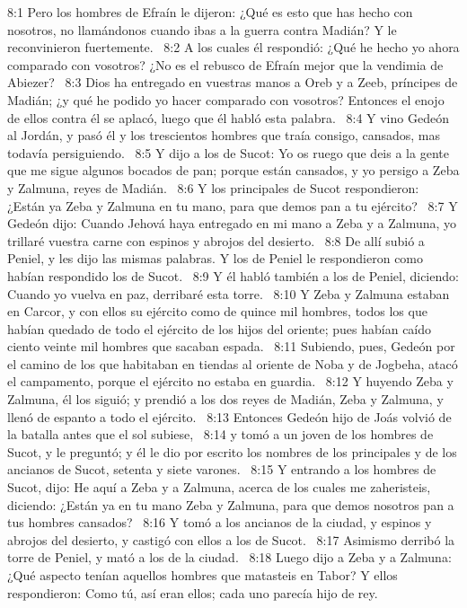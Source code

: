 8:1 Pero los hombres de Efraín le dijeron: ¿Qué es esto que has hecho con nosotros, no llamándonos cuando ibas a la guerra contra Madián? Y le reconvinieron fuertemente.  
8:2 A los cuales él respondió: ¿Qué he hecho yo ahora comparado con vosotros? ¿No es el rebusco de Efraín mejor que la vendimia de Abiezer?  
8:3 Dios ha entregado en vuestras manos a Oreb y a Zeeb, príncipes de Madián; ¿y qué he podido yo hacer comparado con vosotros? Entonces el enojo de ellos contra él se aplacó, luego que él habló esta palabra.  
8:4 Y vino Gedeón al Jordán, y pasó él y los trescientos hombres que traía consigo, cansados, mas todavía persiguiendo.  
8:5 Y dijo a los de Sucot: Yo os ruego que deis a la gente que me sigue algunos bocados de pan; porque están cansados, y yo persigo a Zeba y Zalmuna, reyes de Madián.  
8:6 Y los principales de Sucot respondieron: ¿Están ya Zeba y Zalmuna en tu mano, para que demos pan a tu ejército?  
8:7 Y Gedeón dijo: Cuando Jehová haya entregado en mi mano a Zeba y a Zalmuna, yo trillaré vuestra carne con espinos y abrojos del desierto.  
8:8 De allí subió a Peniel, y les dijo las mismas palabras. Y los de Peniel le respondieron como habían respondido los de Sucot.  
8:9 Y él habló también a los de Peniel, diciendo: Cuando yo vuelva en paz, derribaré esta torre.  
8:10 Y Zeba y Zalmuna estaban en Carcor, y con ellos su ejército como de quince mil hombres, todos los que habían quedado de todo el ejército de los hijos del oriente; pues habían caído ciento veinte mil hombres que sacaban espada.  
8:11 Subiendo, pues, Gedeón por el camino de los que habitaban en tiendas al oriente de Noba y de Jogbeha, atacó el campamento, porque el ejército no estaba en guardia.  
8:12 Y huyendo Zeba y Zalmuna, él los siguió; y prendió a los dos reyes de Madián, Zeba y Zalmuna, y llenó de espanto a todo el ejército.  
8:13 Entonces Gedeón hijo de Joás volvió de la batalla antes que el sol subiese,  
8:14 y tomó a un joven de los hombres de Sucot, y le preguntó; y él le dio por escrito los nombres de los principales y de los ancianos de Sucot, setenta y siete varones.  
8:15 Y entrando a los hombres de Sucot, dijo: He aquí a Zeba y a Zalmuna, acerca de los cuales me zaheristeis, diciendo: ¿Están ya en tu mano Zeba y Zalmuna, para que demos nosotros pan a tus hombres cansados?  
8:16 Y tomó a los ancianos de la ciudad, y espinos y abrojos del desierto, y castigó con ellos a los de Sucot.  
8:17 Asimismo derribó la torre de Peniel, y mató a los de la ciudad.  
8:18 Luego dijo a Zeba y a Zalmuna: ¿Qué aspecto tenían aquellos hombres que matasteis en Tabor? Y ellos respondieron: Como tú, así eran ellos; cada uno parecía hijo de rey.  

